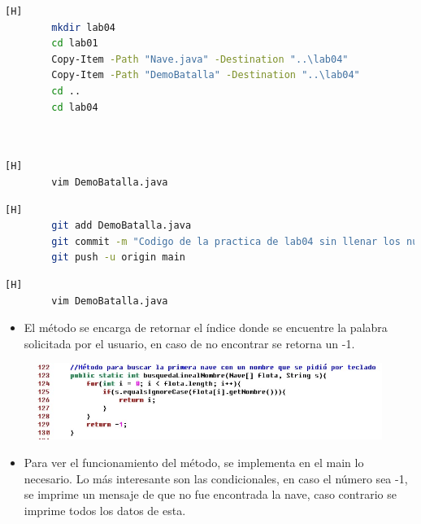 \documentclass{article}
\begin{document}
	
	\begin{lstlisting}[language=bash,caption={Preparando los archivos, para ello se copiará el código del lab03 al lab04 }][H]
		mkdir lab04
		cd lab01
		Copy-Item -Path "Nave.java" -Destination "..\lab04"
		Copy-Item -Path "DemoBatalla" -Destination "..\lab04"
		cd ..
		cd lab04	
		
		
	\end{lstlisting}
	
	\begin{lstlisting}[language=bash,caption={Se copian los métodos que faltan al código DemoBatalla.java, ahora solo hay que completar los métodos}][H]
		vim DemoBatalla.java
	\end{lstlisting}
	
		
	\begin{lstlisting}[language=bash,caption={Commit: Codigo de la practica de lab04 sin llenar los nuevos metodos }][H]
		git add DemoBatalla.java
		git commit -m "Codigo de la practica de lab04 sin llenar los nuevos metodos"
		git push -u origin main
	\end{lstlisting}
	
	
	
	\begin{lstlisting}[language=bash,caption={Implementado el método busquedaLinealNombre}][H]
		vim DemoBatalla.java
	\end{lstlisting}
	
	
	\begin{itemize}	
		\item El método se encarga de retornar el índice donde se encuentre la palabra solicitada por el usuario, en caso de no encontrar se retorna un -1. 
	\end{itemize}	
	
	\begin{figure}[H]
		\centering
		\includegraphics[width=1\textwidth,keepaspectratio]{img/2.jpg}
	\end{figure}
	
		
	\begin{itemize}	
		\item Para ver el funcionamiento del método, se implementa en el main lo necesario. Lo más interesante son las condicionales, en caso el número sea -1, se imprime un mensaje de que no fue encontrada la nave, caso contrario se imprime todos los datos de esta.
	\end{itemize}	
	
\end{document}

